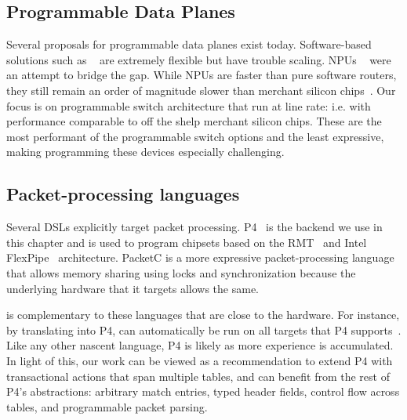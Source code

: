 \subsection{Programmable Data Planes}
Several proposals for programmable data planes exist today. Software-based
solutions such as ~\cite{click, fastpass, flexplane} are extremely flexible but
have trouble scaling. NPUs ~\cite{intel} were an attempt to bridge the gap.
While NPUs are faster than pure software routers, they still remain an order of
magnitude slower than merchant silicon chips~\cite{rmt}. Our focus is on
programmable switch architecture that run at line rate: i.e. with performance
comparable to off the shelp merchant silicon chips. These are the most
performant of the programmable switch options and the least expressive, making
programming these devices especially challenging.


\subsection{Packet-processing languages}
Several DSLs explicitly target packet processing. P4~\cite{p4} is the backend
we use in this chapter and is used to program chipsets based on the
RMT~\cite{rmt} and Intel FlexPipe~\cite{flexpipe} architecture. PacketC is a
more expressive packet-processing language that allows memory sharing using
locks and synchronization because the underlying hardware that it targets
allows the same.

\pktlanguage{} is complementary to these languages that are close to the
hardware. For instance, by translating into P4, \pktlanguage{} can automatically be
run on all targets that P4 supports~\cite{lavanya_compiler}. Like any other
nascent language, P4 is likely as more experience is accumulated. In light of
this, our work can be viewed as a recommendation to extend P4 with
transactional actions that span multiple tables, and can benefit from the rest
of P4's abstractions: arbitrary match entries, typed header fields, control
flow across tables, and programmable packet parsing.

